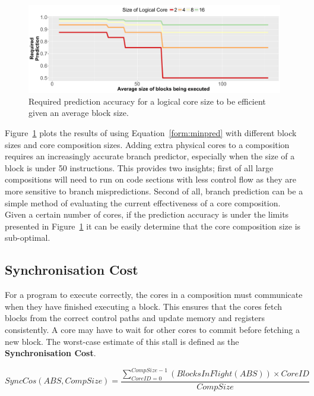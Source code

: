 \begin{figure}[t]
    \centering
    \includegraphics[width=\textwidth]{cases-paper/graphics/limit_study/prediction_req.pdf}
    \caption{Required prediction accuracy for a logical core size to be efficient given an average block size.}
    \label{fig:req_pred}
	\vspace{1em}
\end{figure}
Figure~\ref{fig:req_pred} plots the results of using Equation~\ref{form:minpred} with different block sizes and core composition sizes.
Adding extra physical cores to a composition requires an increasingly accurate branch predictor, especially when the size of a block is under 50 instructions.
This provides two insights; first of all large compositions will need to run on code sections with less control flow as they are more sensitive to branch mispredictions.
Second of all, branch prediction can be a simple method of evaluating the current effectiveness of a core composition.
Given a certain number of cores, if the prediction accuracy is under the limits presented in Figure~\ref{fig:req_pred} it can be easily determine that the core composition size is sub-optimal.

\subsection{Synchronisation Cost}

For a program to execute correctly, the cores in a composition must communicate when they have finished executing a block.
This ensures that the cores fetch blocks from the correct control paths and update memory and registers consistently.
A core may have to wait for other cores to commit before fetching a new block. 
The worst-case estimate of this stall is defined as the \textbf{Synchronisation Cost}.

\begin{equation}\label{form:synccost}
SyncCos(ABS,CompSize) = \frac{\sum_{CoreID=0}^{CompSize-1}\left(BlocksInFlight(ABS)\right) \times CoreID }{CompSize}
\end{equation}


